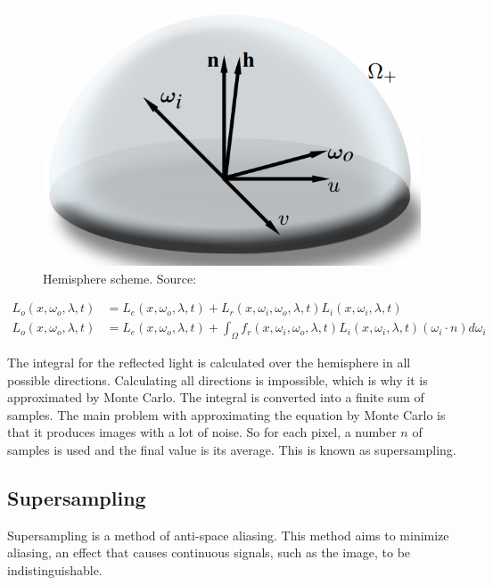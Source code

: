 \documentclass[titlepage,12pt]{report}
\begin{document}
\begin{figure}[!ht]
	\centering
	\includegraphics[scale=0.35]{media/Rendering_eq.png}
	\caption{Hemisphere scheme. Source: \citep{Kurt2010}}
	\label{rendeq}
\end{figure}

\begin{equation}
\begin{split}
L_o(x,\omega_o,\lambda,t) & = L_e(x,\omega_o,\lambda,t) + L_r(x,\omega_i,\omega_o,\lambda,t)L_i(x,\omega_i,\lambda,t) \\
L_o(x,\omega_o,\lambda,t) & = L_e(x,\omega_o,\lambda,t) + \int_\Omega f_r(x,\omega_i,\omega_o,\lambda,t)L_i(x,\omega_i,\lambda,t)(\omega_i \cdot n) d\omega_i
\end{split}
\end{equation}

The integral for the reflected light is calculated over the hemisphere in all possible directions. Calculating all directions is impossible, which is why it is approximated by Monte Carlo. The integral is converted into a finite sum of samples. The main problem with approximating the equation by Monte Carlo is that it produces images with a lot of noise. So for each pixel, a number $n$ of samples is used and the final value is its average. This is known as supersampling.

\subsection{Supersampling}

Supersampling is a method of anti-space aliasing. This method aims to minimize aliasing, an effect that causes continuous signals, such as the image, to be indistinguishable. 
\end{document}
